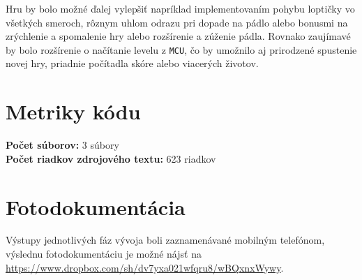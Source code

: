 \documentclass[12pt,a4paper,titlepage,final]{article}
\begin{document}
Hru by bolo možné ďalej vylepšiť napríklad implementovaním pohybu loptičky vo všetkých smeroch, rôznym uhlom odrazu 
pri dopade na pádlo alebo bonusmi na zrýchlenie a spomalenie hry alebo rozšírenie a zúženie pádla. Rovnako zaujímavé
by bolo rozšírenie o načítanie levelu z \texttt{MCU}, čo by umožnilo aj prirodzené spustenie novej hry, priadnie počítadla skóre
alebo viacerých životov.

\appendix

\section{Metriky kódu} \label{metriky}
{\bf Počet súborov:} 3 súbory \\
{\bf Počet riadkov zdrojového textu:} 623 riadkov \\

\section{Fotodokumentácia}
Výstupy jednotlivých fáz vývoja boli zaznamenávané mobilným telefónom, výslednu fotodokumentáciu je možné nájsť na
\url{https://www.dropbox.com/sh/dv7yxa021wfqru8/wBQxnxWywy}.
\end{document}

